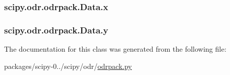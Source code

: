 \subsubsection[{x}]{\setlength{\rightskip}{0pt plus 5cm}scipy.\+odr.\+odrpack.\+Data.\+x}\label{classscipy_1_1odr_1_1odrpack_1_1Data_a8be6f83ceeac7832a691aa050c861ecd}
\hypertarget{classscipy_1_1odr_1_1odrpack_1_1Data_a552d99ca532d3351ada6e84ffde9fe53}{}
\subsubsection[{y}]{\setlength{\rightskip}{0pt plus 5cm}scipy.\+odr.\+odrpack.\+Data.\+y}\label{classscipy_1_1odr_1_1odrpack_1_1Data_a552d99ca532d3351ada6e84ffde9fe53}


The documentation for this class was generated from the following file\+:\begin{DoxyCompactItemize}
\item 
packages/scipy-\/0../scipy/odr/\hyperlink{odrpack_8py}{odrpack.\+py}\end{DoxyCompactItemize}
